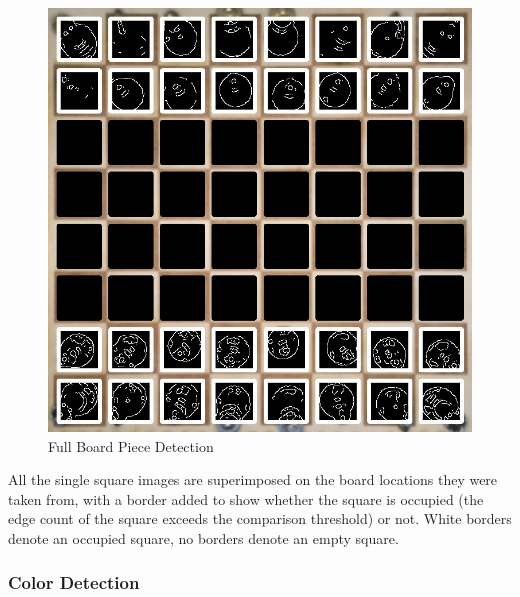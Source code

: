 \documentclass[journal]{IEEEtran}
\begin{document}
\begin{figure}[!ht]
	\centering
	\includegraphics[width=\linewidth]{Images/PieceDetection.jpg}
	\caption{Full Board Piece Detection}
	\label{piece detection}
\end{figure}

All the single square images are superimposed on the board locations they were taken from, with a border added to show whether the square is occupied (the edge count of the square exceeds the comparison threshold) or not. White borders denote an occupied square, no borders denote an empty square.

\vspace{12pt}

\subsubsection{Color Detection}
\end{document}
